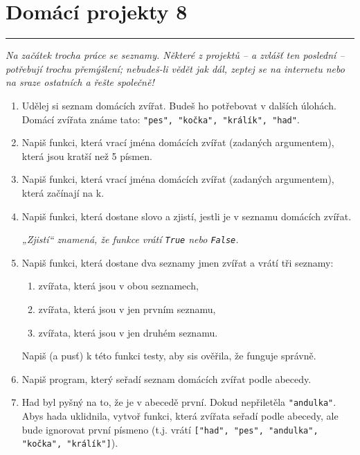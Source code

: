 \documentclass[a4paper,10pt]{article}
\newcommand\plsetno{8}
\newcommand\startsection[1]{
     \vspace{0.2ex}
    \hrule
    {\fontspec{Oxygen} \tiny
     \vspace{-1ex}
     \emph{#1}
     \vspace{-1.5em}
    }
}
\begin{document}
\section*{Domácí projekty \plsetno}

\startsection{Na začátek trocha práce se seznamy.
    Některé z projektů – a zvlášť ten poslední – potřebují trochu přemýšlení;
    nebudeš-li vědět jak dál, zeptej se na internetu nebo na sraze ostatních
    a řešte společně!}

\begin{enumerate}

\item Udělej si seznam domácích zvířat. Budeš ho potřebovat v dalších úlohách.
    \\Domácí zvířata známe tato: \verb+"pes", "kočka", "králík", "had"+.


\item Napiš funkci, která vrací jména domácích zvířat (zadaných argumentem), která jsou kratší než 5 písmen.

\item Napiš funkci, která vrací jména domácích zvířat (zadaných argumentem), která začínají na k.

\item Napiš funkci, která dostane slovo a zjistí,
    jestli je v seznamu domácích zvířat.

    \emph{„Zjistí“ znamená, že funkce vrátí \texttt{True} nebo \texttt{False}.}

\item Napiš funkci, která dostane dva seznamy jmen zvířat a vrátí tři seznamy:
    \begin{enumerate}
        \item zvířata, která jsou v obou seznamech,
        \item zvířata, která jsou v jen prvním seznamu,
        \item zvířata, která jsou v jen druhém seznamu.
    \end{enumerate}
    Napiš (a pusť) k této funkci testy, aby sis ověřila, že funguje správně.

\item Napiš program, který seřadí seznam domácích zvířat podle abecedy.

\item Had byl pyšný na to, že je v abecedě první.
    Dokud nepřiletěla \verb+"andulka"+.
    \\Abys hada uklidnila, vytvoř funkci, která zvířata seřadí podle abecedy,
    ale bude ignorovat první písmeno (t.j. vrátí
        \texttt{["h{\color{plpink}ad}",
                 "p{\color{plpink}es}",
                 "a{\color{plpink}ndulka}",
                 "k{\color{plpink}očka}",
                 "k{\color{plpink}rálík}"]}).


\end{enumerate}
\end{document}
